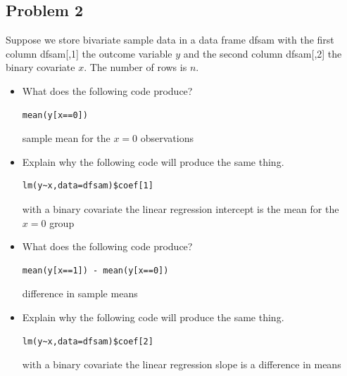 \documentclass[10pt]{article}
\begin{document}
\clearpage

\subsection*{Problem 2}

Suppose we store bivariate sample data in a data frame dfsam with the first column dfsam[,1] the outcome variable $y$ and the second column dfsam[,2]  the binary covariate $x$. The number of rows is $n$.

\begin{itemize}
\item[a)]  What does the following code produce?

\begin{verbatim}
mean(y[x==0]) 
\end{verbatim}

\color{red} sample mean for the $x=0$ observations \color{black}
\item[b)]  Explain why the following code will produce the same thing.

\begin{verbatim}
lm(y~x,data=dfsam)$coef[1]
\end{verbatim}

\color{red} with a binary covariate the linear regression intercept is the mean for the $x=0$ group  \color{black}



\item[c)]  What does the following code produce?

\begin{verbatim}
mean(y[x==1]) - mean(y[x==0]) 
\end{verbatim}

\color{red} difference in sample means \color{black}
\item[d)]  Explain why the following code will produce the same thing.

\begin{verbatim}
lm(y~x,data=dfsam)$coef[2]
\end{verbatim}

\color{red} with a binary covariate the linear regression slope is a difference in means \color{black}



\end{itemize}

\clearpage

\end{document}
